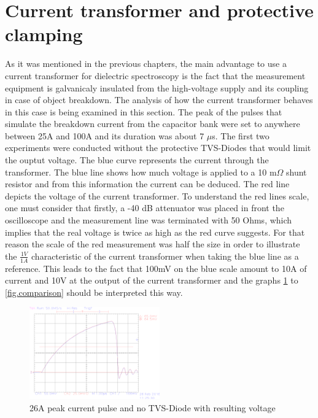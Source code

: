 \section{Current transformer and protective clamping} 
As it was mentioned in the previous chapters, the main advantage to use a current transformer for
dielectric spectroscopy is the fact that the measurement equipment is galvanicaly insulated from the high-voltage supply and its
coupling in case of object breakdown. The analysis of how the current transformer behaves in this case is being examined in this section.
The peak of the pulses that simulate the breakdown current from the capacitor bank were set to anywhere between 25A and 100A and its duration was about 7 $\mu$s.
The first two experiments were conducted without the protective TVS-Diodes that would limit the ouptut voltage.
The blue curve represents the current through the transformer. The blue line shows how much voltage is applied to a 10 m$\Omega$ shunt resistor and from this information the current can
be deduced. The red line depicts the voltage of the current transformer. To understand the red lines scale, one must consider that firstly, a -40 dB attenuator was placed in front the
oscilloscope and the measurement line was terminated with 50 Ohms, which implies that the real voltage is twice as high as the red curve suggests. For that reason the scale of the red measurement was half the size in order to illustrate the
$\frac{1V}{1A}$ characteristic of the current transformer when taking the blue line as a reference.
\newline 
This leads to the fact that 100mV on the blue scale amount to 10A of current and 10V at the output of the current transformer and the graphs \ref{fig.26Anodiode} to \ref{fig.comparison} should be interpreted
this way.


\begin{figure}[!ht]
	\centering
	\includegraphics[width=0.5\textwidth]{figures/Voltage_Clamping/TEK00001.eps}		
	\caption[Kurze Abbildungsbeschreibung]{26A peak current pulse and no TVS-Diode with resulting voltage} 
	\label{fig.26Anodiode}
\end{figure}

